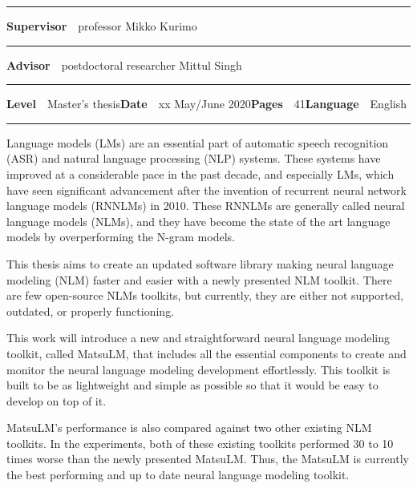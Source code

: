 \begin{spacing}{.88}
{\vspace{-2.4mm}\rule{\textwidth}{.75pt}

{\fontsize{10.5pt}{10.5pt}\bfseries\sffamily\lsstyle Supervisor}~~{\small professor Mikko Kurimo}

\vspace{-2.4mm}\rule{\textwidth}{.75pt}

{\fontsize{10.5pt}{10.5pt}\bfseries\sffamily\lsstyle Advisor}~~{\small postdoctoral researcher Mittul Singh}

\vspace{-2.4mm}\rule{\textwidth}{.75pt}

{\fontsize{10.5pt}{10.5pt}\bfseries\sffamily\lsstyle Level}~~{\small Master's thesis}\hfill{\fontsize{10.5pt}{10.5pt}\bfseries\sffamily\lsstyle Date}~~{\small xx May/June 2020}\hfill{\fontsize{10.5pt}{10.5pt}\bfseries\sffamily\lsstyle Pages}~~{\small 41}\hfill{\fontsize{10.5pt}{10.5pt}\bfseries\sffamily\lsstyle Language}~~{\small English}

\vspace{-2.4mm}\rule{\textwidth}{.75pt}

\vspace{6mm}

} %
\end{spacing}
\begin{spacing}{1.05}

\vspace{.8mm}

{\small
Language models (LMs) are an essential part of automatic speech recognition (ASR) and natural language processing (NLP) systems. These systems have improved at a considerable pace in the past decade, and especially LMs, which have seen significant advancement after the invention of recurrent neural network language models (RNNLMs) in 2010. These RNNLMs are generally called neural language models (NLMs), and they have become the state of the art language models by overperforming the N-gram models.

This thesis aims to create an updated software library making neural language modeling (NLM) faster and easier with a newly presented NLM toolkit. There are few open-source NLMs toolkits, but currently, they are either not supported, outdated, or properly functioning. 

This work will introduce a new and straightforward neural language modeling toolkit, called MatsuLM, that includes all the essential components to create and monitor the neural language modeling development effortlessly. This toolkit is built to be as lightweight and simple as possible so that it would be easy to develop on top of it.

MatsuLM's performance is also compared against two other existing NLM toolkits. In the experiments, both of these existing toolkits performed 30 to 10 times worse than the newly presented MatsuLM. Thus, the MatsuLM is currently the best performing and up to date neural language modeling toolkit.
}

\vfill

\end{spacing}
